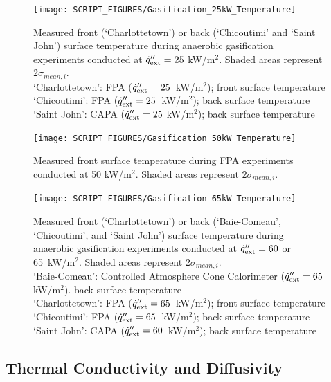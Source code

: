 \documentclass{book}
\begin{document}
\begin{figure}[h!]
  \centering
  \texttt{[image: SCRIPT\_FIGURES/Gasification\_25kW\_Temperature]}
  \caption{Measured front (‘Charlottetown’) or back (‘Chicoutimi’ and ‘Saint John’) surface temperature during anaerobic gasification experiments conducted at $\dot{q}_{\rm ext}'' = 25$ kW/m$^2$. Shaded areas represent $2\sigma_{mean,i}$. \\
‘Charlottetown’:  FPA ($\dot{q}_{\rm ext}'' = 25$~kW/m$^2$); front surface temperature \\
‘Chicoutimi’:   FPA ($\dot{q}_{\rm ext}'' = 25$~kW/m$^2$); back surface temperature \\
‘Saint John’:   CAPA ($\dot{q}_{\rm ext}'' = 25$ kW/m$^2$); back surface temperature}
  \label{Fig:Gasification_25kW_Temperature}
\end{figure}

\begin{figure}[h!]
  \centering
  \texttt{[image: SCRIPT\_FIGURES/Gasification\_50kW\_Temperature]}
  \caption{Measured front surface temperature during FPA experiments conducted at 50 kW/m$^2$. Shaded areas represent $2\sigma_{mean,i}$.}
  \label{Fig:Gasification_50kW_Temperature}
\end{figure}

\begin{figure}[h!]
  \centering
  \texttt{[image: SCRIPT\_FIGURES/Gasification\_65kW\_Temperature]}
  \caption{Measured front (‘Charlottetown’) or back (‘Baie-Comeau’, ‘Chicoutimi’, and ‘Saint John’) surface temperature during anaerobic gasification experiments conducted at $\dot{q}_{\rm ext}'' = 60$ or 65~kW/m$^2$. Shaded areas represent $2\sigma_{mean,i}$. \\
 ‘Baie-Comeau’:  Controlled Atmosphere Cone Calorimeter ($\dot{q}_{\rm ext}'' = 65$ kW/m$^2$). back surface temperature \\
‘Charlottetown’:  FPA ($\dot{q}_{\rm ext}'' = 65$~kW/m$^2$); front surface temperature \\
‘Chicoutimi’:   FPA ($\dot{q}_{\rm ext}'' = 65$~kW/m$^2$); back surface temperature  \\
‘Saint John’:   CAPA ($\dot{q}_{\rm ext}'' = 60$~kW/m$^2$); back surface temperature}
  \label{Fig:Gasification_65kW_Temperature}
\end{figure}


\subsection{Thermal Conductivity and Diffusivity}
\end{document}
